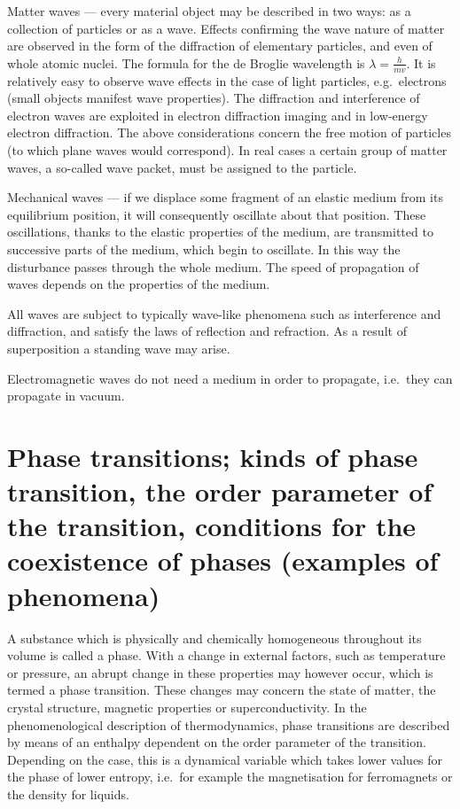Matter waves --- every material object may be described in two ways: as a collection of particles or as a wave. Effects confirming the wave nature of matter are observed in the form of the diffraction of elementary particles, and even of whole atomic nuclei. The formula for the de Broglie wavelength is $\lambda = \frac{h}{mv}$. It is relatively easy to observe wave effects in the case of light particles, e.g.\ electrons (small objects manifest wave properties). The diffraction and interference of electron waves are exploited in electron diffraction imaging and in low-energy electron diffraction. The above considerations concern the free motion of particles (to which plane waves would correspond). In real cases a certain group of matter waves, a so-called wave packet, must be assigned to the particle.

Mechanical waves --- if we displace some fragment of an elastic medium from its equilibrium position, it will consequently oscillate about that position. These oscillations, thanks to the elastic properties of the medium, are transmitted to successive parts of the medium, which begin to oscillate. In this way the disturbance passes through the whole medium. The speed of propagation of waves depends on the properties of the medium.

All waves are subject to typically wave-like phenomena such as interference and diffraction, and satisfy the laws of reflection and refraction. As a result of superposition a standing wave may arise.

Electromagnetic waves do not need a medium in order to propagate, i.e.\ they can propagate in vacuum.

\section{Phase transitions; kinds of phase transition, the order parameter of the transition, conditions for the coexistence of phases (examples of phenomena)}

A substance which is physically and chemically homogeneous throughout its volume is called a phase. With a change in external factors, such as temperature or pressure, an abrupt change in these properties may however occur, which is termed a phase transition. These changes may concern the state of matter, the crystal structure, magnetic properties or superconductivity. In the phenomenological description of thermodynamics, phase transitions are described by means of an enthalpy\merr{} dependent on the order parameter of the transition. Depending on the case, this is a dynamical variable which takes lower values for the phase of lower entropy\merr, i.e.\ for example the magnetisation for ferromagnets or the density for liquids.

